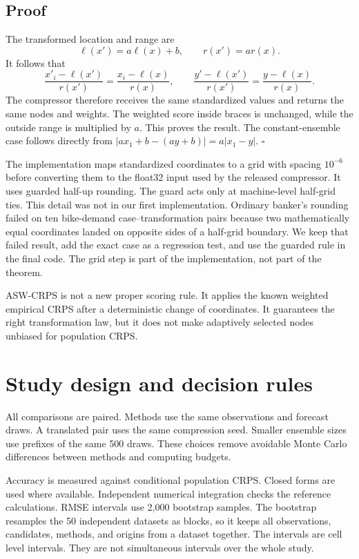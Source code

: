 \documentclass[11pt]{article}
\begin{document}
\subsection*{Proof}
The transformed location and range are
\[
\ell(x')=a\ell(x)+b,
\qquad
r(x')=ar(x).
\]
It follows that
\[
\frac{x'_i-\ell(x')}{r(x')}
=\frac{x_i-\ell(x)}{r(x)},
\qquad
\frac{y'-\ell(x')}{r(x')}
=\frac{y-\ell(x)}{r(x)}.
\]
The compressor therefore receives the same standardized values and returns the same nodes and weights. The weighted score inside braces is unchanged, while the outside range is multiplied by $a$. This proves the result. The constant-ensemble case follows directly from $|ax_1+b-(ay+b)|=a|x_1-y|$. \hfill$\square$

The implementation maps standardized coordinates to a grid with spacing $10^{-6}$ before converting them to the float32 input used by the released compressor. It uses guarded half-up rounding. The guard acts only at machine-level half-grid ties. This detail was not in our first implementation. Ordinary banker's rounding failed on ten bike-demand case--transformation pairs because two mathematically equal coordinates landed on opposite sides of a half-grid boundary. We keep that failed result, add the exact case as a regression test, and use the guarded rule in the final code. The grid step is part of the implementation, not part of the theorem.

ASW-CRPS is not a new proper scoring rule. It applies the known weighted empirical CRPS after a deterministic change of coordinates. It guarantees the right transformation law, but it does not make adaptively selected nodes unbiased for population CRPS.

\section{Study design and decision rules}

All comparisons are paired. Methods use the same observations and forecast draws. A translated pair uses the same compression seed. Smaller ensemble sizes use prefixes of the same 500 draws. These choices remove avoidable Monte Carlo differences between methods and computing budgets.

Accuracy is measured against conditional population CRPS. Closed forms are used where available. Independent numerical integration checks the reference calculations. RMSE intervals use 2,000 bootstrap samples. The bootstrap resamples the 50 independent datasets as blocks, so it keeps all observations, candidates, methods, and origins from a dataset together. The intervals are cell level intervals. They are not simultaneous intervals over the whole study.
\end{document}
